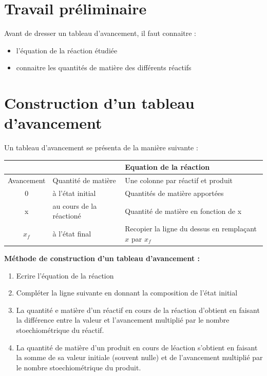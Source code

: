 \documentclass[a4paper,11pt,fleqn]{article}%
\begin{document}
\maketitle
\section{Travail préliminaire}
Avant de dresser un tableau d'avancement, il faut connaitre : 
\begin{itemize}
\item l'équation de la réaction étudiée
\item connaitre les quantités de matière des différents réactifs
\end{itemize}

\section{Construction d'un tableau d'avancement}
Un tableau d'avancement se présenta de la manière suivante :\\
\begin{center}
    \begin{tabular}{|c|>{\centering}m{.2\linewidth}|>{\centering\arraybackslash}m{.5\linewidth}|}
\hline
 &&Equation de la réaction\\
\hline
Avancement & Quantité de matière & Une colonne par réactif et produit\\
\hline
0& à l'état initial& Quantités de matière apportées\\
\hline
x& au cours de la réactioné&Quantité de matière en fonction de x\\
\hline
$x_f$& à l'état final&Recopier la ligne du dessus en remplaçant $x$ par $x_f$\\
\hline
\end{tabular}
\end{center}

\textbf{Méthode de construction d'un tableau d'avancement :}
\begin{enumerate}
\item Ecrire l'équation de la réaction
\item Compléter la ligne suivante en donnant la composition de l'état initial
\item La quantité e matière d'un réactif en cours de la réaction d'obtient en faisant la différence entre la valeur et l'avancement multiplié par le nombre stoechiométrique du réactif.
\item La quantité de matière d'un produit en cours de léaction s'obtient en faisant la somme de sa valeur initiale (souvent nulle) et de l'avancement multiplié par le nombre stoechiométrique du produit.
\end{enumerate}
\end{document}
